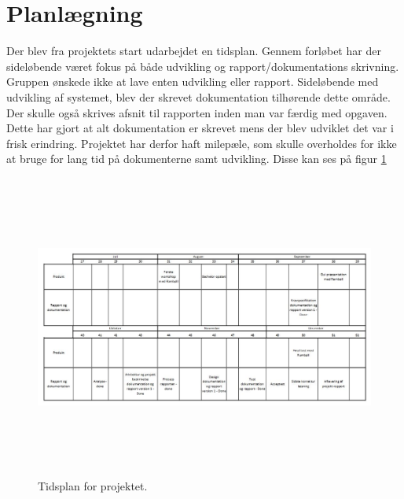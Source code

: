 \section{Planlægning}
Der blev fra projektets start udarbejdet en tidsplan.
Gennem forløbet har der sideløbende været fokus på både udvikling og rapport/dokumentations skrivning.
Gruppen ønskede ikke at lave enten udvikling eller rapport. Sideløbende med udvikling af systemet, blev der skrevet dokumentation tilhørende dette område. Der skulle også skrives afsnit til rapporten inden man var færdig med opgaven. \\
Dette har gjort at alt dokumentation er skrevet mens der blev udviklet det var i frisk erindring.
Projektet har derfor haft milepæle, som skulle overholdes for ikke at bruge for lang tid på dokumenterne samt udvikling. Disse kan ses på figur \ref{fig:Tidsplan}

\begin{figure} [H]
	\begin{center}
		\includegraphics[height=10cm, width=16cm]{Planlaegning/Tidsplan}
	\end{center}
	\caption{Tidsplan for projektet.}
	\label{fig:Tidsplan}
\end{figure}

\clearpage

